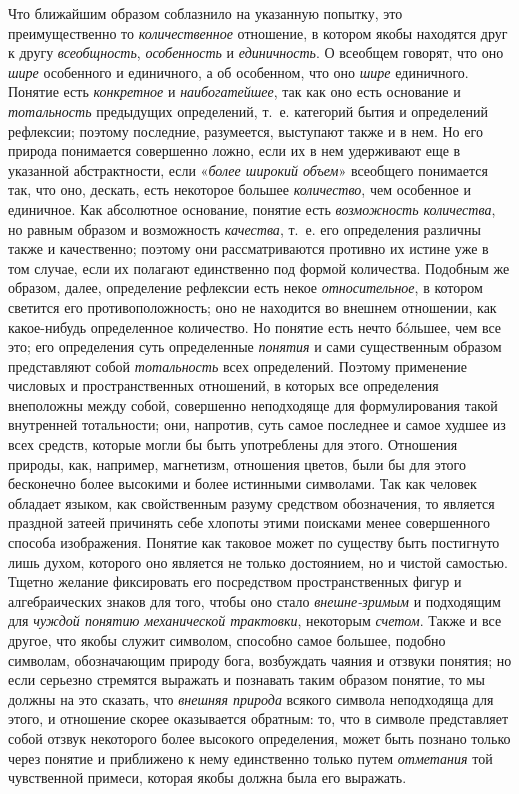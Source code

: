 \documentclass[twoside]{article}
\begin{document}
{{Что ближайшим образом соблазнило на указанную попытку, это
преимущественно то {\em количественное}
отношение, в котором якобы находятся друг к другу
{\em всеобщность},
{\em особенность} и
{\em единичность}. О
всеобщем говорят, что оно {\em шире}
особенного и единичного, а об особенном, что оно
{\em шире} единичного.
Понятие есть {\em конкретное}
и {\em наибогатейшее},
так как оно есть основание и
{\em тотальность}
предыдущих определений, т.~е. категорий бытия и определений
рефлексии; поэтому последние, разумеется, выступают также и в нем. Но его
природа понимается совершенно ложно, если их в нем удерживают еще в
указанной абстрактности, если
«{\em более широкий объем}»
всеобщего понимается так, что оно, дескать, есть некоторое
большее {\em количество},
чем особенное и единичное. Как абсолютное основание, понятие
есть {\em возможность количества},
но равным образом и возможность
{\em качества}, т.~е. его
определения различны также и качественно; поэтому они рассматриваются
противно их истине уже в том случае, если их полагают единственно под
формой количества. Подобным же образом, далее, определение рефлексии есть
некое {\em относительное},
в котором светится его противоположность; оно не находится во
внешнем отношении, как какое-нибудь определенное количество. Но понятие
есть нечто бóльшее, чем все это; его определения суть определенные
{\em понятия} и сами
существенным образом представляют собой
{\em тотальность} всех
определений. Поэтому применение числовых и пространственных отношений, в
которых все определения внеположны между собой, совершенно неподходяще для
формулирования такой внутренней тотальности; они, напротив, суть самое
последнее и самое худшее из всех средств, которые могли бы быть употреблены
для этого. Отношения природы, как, например, магнетизм, отношения цветов,
были бы для этого бесконечно более высокими и более истинными символами.
Так как человек обладает языком, как свойственным разуму средством
обозначения, то является праздной затеей причинять себе
хлопоты этими поисками менее совершенного способа изображения. Понятие как
таковое может по существу быть постигнуто лишь духом, которого оно является
не только достоянием, но и чистой самостью. Тщетно желание фиксировать его
посредством пространственных фигур и алгебраических знаков для того, чтобы
оно стало {\em внешне-зримым
}и подходящим для
{\em чуждой понятию механической
трактовки}, некоторым
{\em счетом}. Также и все
другое, что якобы служит символом, способно самое большее, подобно
символам, обозначающим природу бога, возбуждать чаяния и отзвуки понятия;
но если серьезно стремятся выражать и познавать таким образом понятие, то
мы должны на это сказать, что
{\em внешняя природа}
всякого символа неподходяща для этого, и отношение скорее
оказывается обратным: то, что в символе представляет собой отзвук
некоторого более высокого определения, может быть познано только через
понятие и приближено к нему единственно только путем
{\em отметания} той
чувственной примеси, которая якобы должна была его выражать.

}}
\end{document}
